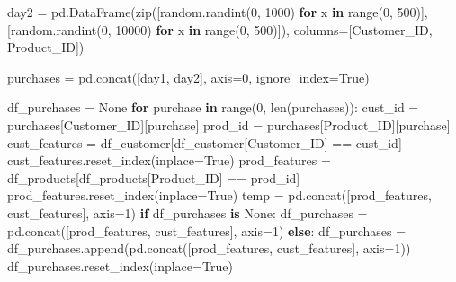\documentclass[]{tufte-book}
\newenvironment{Shaded}{}{}
\newcommand{\BuiltInTok}[1]{#1}
\newcommand{\ControlFlowTok}[1]{\textcolor[rgb]{0.00,0.44,0.13}{\textbf{#1}}}
\newcommand{\DecValTok}[1]{\textcolor[rgb]{0.25,0.63,0.44}{#1}}
\newcommand{\KeywordTok}[1]{\textcolor[rgb]{0.00,0.44,0.13}{\textbf{#1}}}
\newcommand{\NormalTok}[1]{#1}
\newcommand{\OperatorTok}[1]{\textcolor[rgb]{0.40,0.40,0.40}{#1}}
\newcommand{\StringTok}[1]{\textcolor[rgb]{0.25,0.44,0.63}{#1}}
\newcommand{\VariableTok}[1]{\textcolor[rgb]{0.10,0.09,0.49}{#1}}
\theoremstyle{definition}
\theoremstyle{definition}
\theoremstyle{definition}
\theoremstyle{remark}
\begin{document}
\begin{Shaded}
\begin{Highlighting}[]
\NormalTok{day2 }\OperatorTok{=}\NormalTok{ pd.DataFrame(}\BuiltInTok{zip}\NormalTok{([random.randint(}\DecValTok{0}\NormalTok{, }\DecValTok{1000}\NormalTok{) }\ControlFlowTok{for} 
\NormalTok{x }\KeywordTok{in} \BuiltInTok{range}\NormalTok{(}\DecValTok{0}\NormalTok{, }\DecValTok{500}\NormalTok{)],[random.randint(}\DecValTok{0}\NormalTok{, }\DecValTok{10000}\NormalTok{) }\ControlFlowTok{for} 
\NormalTok{x }\KeywordTok{in} \BuiltInTok{range}\NormalTok{(}\DecValTok{0}\NormalTok{, }\DecValTok{500}\NormalTok{)]), }
\NormalTok{columns}\OperatorTok{=}\NormalTok{[}\StringTok{\textquotesingle{}Customer\_ID\textquotesingle{}}\NormalTok{, }\StringTok{\textquotesingle{}Product\_ID\textquotesingle{}}\NormalTok{])}

\NormalTok{purchases }\OperatorTok{=}\NormalTok{ pd.concat([day1, day2], axis}\OperatorTok{=}\DecValTok{0}\NormalTok{, ignore\_index}\OperatorTok{=}\VariableTok{True}\NormalTok{)}

\NormalTok{df\_purchases }\OperatorTok{=} \VariableTok{None}
\ControlFlowTok{for}\NormalTok{ purchase }\KeywordTok{in} \BuiltInTok{range}\NormalTok{(}\DecValTok{0}\NormalTok{, }\BuiltInTok{len}\NormalTok{(purchases)):}
\NormalTok{    cust\_id }\OperatorTok{=}\NormalTok{ purchases[}\StringTok{\textquotesingle{}Customer\_ID\textquotesingle{}}\NormalTok{][purchase]}
\NormalTok{    prod\_id }\OperatorTok{=}\NormalTok{ purchases[}\StringTok{\textquotesingle{}Product\_ID\textquotesingle{}}\NormalTok{][purchase]}
\NormalTok{    cust\_features }\OperatorTok{=}\NormalTok{ df\_customer[df\_customer[}\StringTok{\textquotesingle{}Customer\_ID\textquotesingle{}}\NormalTok{] }\OperatorTok{==}\NormalTok{ cust\_id]}
\NormalTok{    cust\_features.reset\_index(inplace}\OperatorTok{=}\VariableTok{True}\NormalTok{)}
\NormalTok{    prod\_features }\OperatorTok{=}\NormalTok{ df\_products[df\_products[}\StringTok{\textquotesingle{}Product\_ID\textquotesingle{}}\NormalTok{] }\OperatorTok{==}\NormalTok{ prod\_id]}
\NormalTok{    prod\_features.reset\_index(inplace}\OperatorTok{=}\VariableTok{True}\NormalTok{)}
\NormalTok{    temp }\OperatorTok{=}\NormalTok{ pd.concat([prod\_features, cust\_features], axis}\OperatorTok{=}\DecValTok{1}\NormalTok{)}
    \ControlFlowTok{if}\NormalTok{ df\_purchases }\KeywordTok{is} \VariableTok{None}\NormalTok{:}
\NormalTok{        df\_purchases }\OperatorTok{=}\NormalTok{ pd.concat([prod\_features, cust\_features], axis}\OperatorTok{=}\DecValTok{1}\NormalTok{)}
    \ControlFlowTok{else}\NormalTok{:}
\NormalTok{        df\_purchases }\OperatorTok{=}\NormalTok{ df\_purchases.append(pd.concat([prod\_features, cust\_features], axis}\OperatorTok{=}\DecValTok{1}\NormalTok{))}
\NormalTok{df\_purchases.reset\_index(inplace}\OperatorTok{=}\VariableTok{True}\NormalTok{)}
\end{Highlighting}
\end{Shaded}
\end{document}
